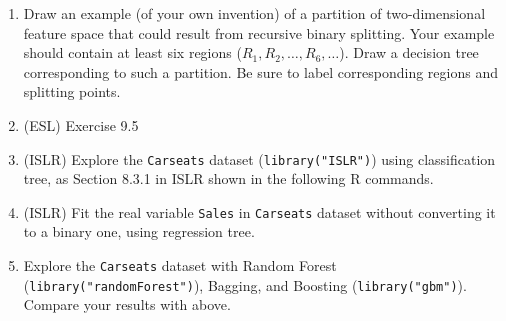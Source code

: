 \documentclass[11pt,compress,epsfig,color]{article}
\begin{document}
\begin{enumerate}
\item Draw an example (of your own invention) of a partition of two-dimensional feature space that could result from recursive binary splitting. Your example should contain at least six regions ($R_1,R_2,\ldots,R_6,\ldots$). Draw a decision tree corresponding to such a partition. Be sure to label corresponding regions and splitting points. 

\item (ESL) Exercise 9.5

\item (ISLR) Explore the {\tt{Carseats}} dataset ({\tt{library("ISLR")}}) using classification tree, as Section 8.3.1 in ISLR shown in the following R commands.
 

\item (ISLR) Fit the real variable {\tt{Sales}} in {\tt{Carseats}} dataset without converting it to a binary one, using regression tree.

\item Explore the {\tt{Carseats}} dataset with Random Forest ({\tt{library("randomForest")}}), Bagging, and Boosting ({\tt{library("gbm")}}). Compare your results with above.




%
\end{enumerate}
\end{document}
